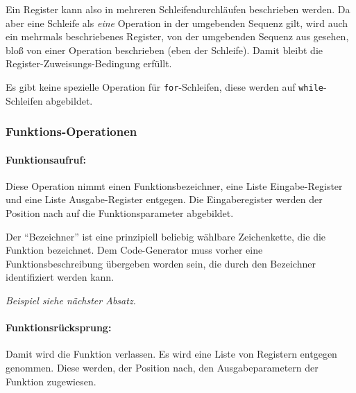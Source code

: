 \documentclass[twoside,a4paper,fleqn,12pt]{book}
\begin{document}

Ein Register kann also in mehreren Schleifendurchläufen beschrieben werden.
Da aber eine Schleife als \emph{eine} Operation in der umgebenden Sequenz gilt, wird auch ein mehrmals beschriebenes Register,
von der umgebenden Sequenz aus gesehen, bloß von einer Operation beschrieben (eben der Schleife).
Damit bleibt die Register-Zuweisungs-Bedingung erfüllt.

Es gibt keine spezielle Operation für \texttt{for}-Schleifen, diese werden auf \texttt{while}-Schleifen abgebildet.


\subsubsection{Funktions-Operationen}

\paragraph{Funktionsaufruf:} Diese Operation nimmt einen Funktionsbezeichner, eine Liste Eingabe-Register und eine Liste Ausgabe-Register
entgegen.
Die Eingaberegister werden der Position nach auf die Funktionsparameter abgebildet.

Der "`Bezeichner"' ist eine prinzipiell beliebig wählbare Zeichenkette, die die Funktion bezeichnet. Dem Code-Generator muss
vorher eine Funktionsbeschreibung übergeben worden sein, die durch den Bezeichner identifiziert werden kann.

\emph{Beispiel siehe nächster Absatz.}


\paragraph{Funktionsrücksprung:} Damit wird die Funktion verlassen. Es wird eine Liste von Registern entgegen genommen. Diese
werden, der Position nach, den Ausgabeparametern der Funktion zugewiesen.
\end{document}
